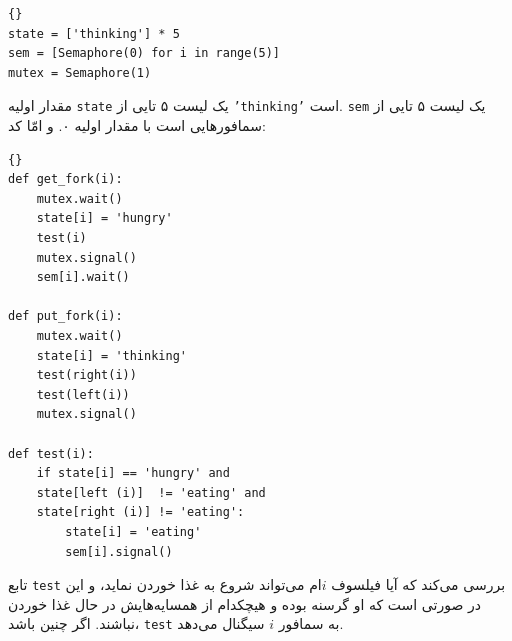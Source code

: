\documentclass{book}
\begin{document}
\begin{latin}
\begin{latin}
\begin{lstlisting}[title=\rl{متغیرهای راه حل تننبام}]{}
state = ['thinking'] * 5
sem = [Semaphore(0) for i in range(5)]
mutex = Semaphore(1)
\end{lstlisting}
\end{latin}
\end{latin}

    مقدار اولیه {\tt state} یک لیست ۵ تایی از {\tt 'thinking'} است.     {\tt sem}
    یک لیست ۵ تایی از سمافورهایی است با مقدار اولیه ۰. 
    و امّا کد: 

\begin{latin}
\begin{latin}
\begin{lstlisting}[title=\rl{ راه حل تننبام}]{}
def get_fork(i):
    mutex.wait()
    state[i] = 'hungry'
    test(i)
    mutex.signal()
    sem[i].wait()

def put_fork(i):
    mutex.wait()
    state[i] = 'thinking'
    test(right(i))
    test(left(i))
    mutex.signal()

def test(i):
    if state[i] == 'hungry' and
    state[left (i)]  != 'eating' and
    state[right (i)] != 'eating':
        state[i] = 'eating'
        sem[i].signal()
\end{lstlisting}
\end{latin}
\end{latin}


    تابع {\tt test}  بررسی می‌کند که آیا فیلسوف $i$ام می‌تواند شروع به غذا خوردن نماید، و این در صورتی است که 
    او گرسنه بوده و هیچکدام از همسایه‌هایش در حال غذا خوردن نباشند. اگر چنین باشد، {\tt test} به سمافور $i$ سیگنال می‌دهد. 
    
\end{document}
